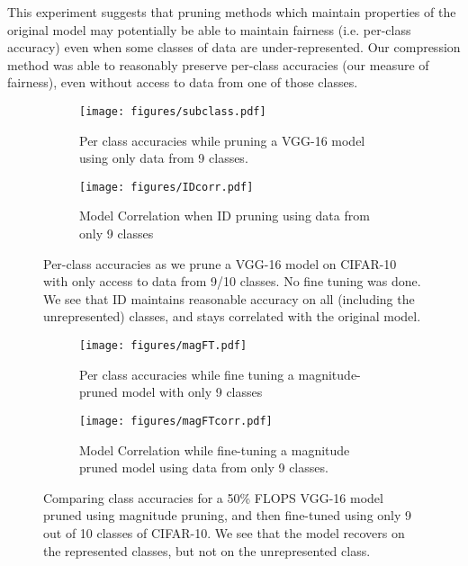 This experiment
suggests that pruning methods which maintain properties of the original model may potentially be able to maintain fairness (i.e. per-class accuracy) even when some classes of data are under-represented.  
Our compression method was able to reasonably preserve per-class accuracies (our measure of fairness), even without access to data from one of those classes.


\begin{figure}
\centering
\begin{subfigure}{.47\textwidth}
\texttt{[image: figures/subclass.pdf]}
\caption{Per class accuracies while pruning a VGG-16 model using only data from 9 classes.}
\label{fig:id_sensitivity_class}
\end{subfigure}
\begin{subfigure}{.47\textwidth}
\texttt{[image: figures/IDcorr.pdf]}
\caption{Model Correlation when ID pruning using data from only 9 classes}
\label{fig:id_sensitivity_corr}
\end{subfigure}
\caption{
Per-class accuracies as we prune a VGG-16 model on CIFAR-10 with only access to data from 9/10 classes.  No fine tuning was done.  We see that ID maintains reasonable accuracy on all (including the unrepresented) classes, and stays correlated with the original model.  
}

\end{figure}

\begin{figure}
\centering
\begin{subfigure}{.47\textwidth}
\texttt{[image: figures/magFT.pdf]}
\caption{Per class accuracies while fine tuning a magnitude-pruned model with only 9 classes}
\label{fig:mag_sensitivity_class}
\end{subfigure}
\begin{subfigure}{.47\textwidth}
\texttt{[image: figures/magFTcorr.pdf]}
\caption{Model Correlation while fine-tuning a magnitude pruned model using data from only 9 classes.}
\label{fig:mag_sensitivity_corr}
\end{subfigure}
\caption{
Comparing class accuracies for a 50\% FLOPS VGG-16 model pruned using magnitude pruning, and then fine-tuned using only 9 out of 10 classes of CIFAR-10.  We see that the model recovers on the represented classes, but not on the unrepresented class. 
}

\end{figure}
